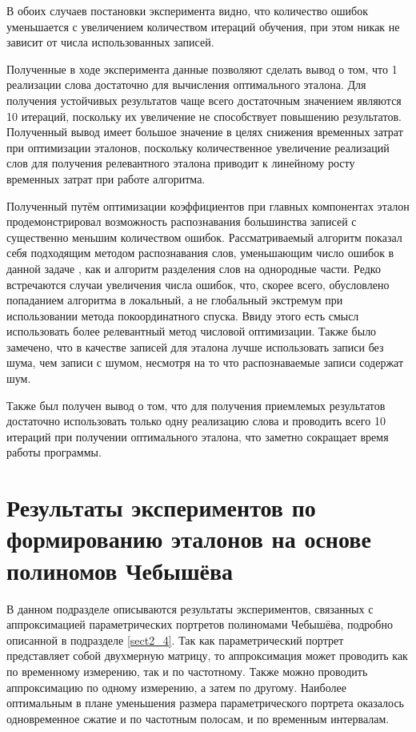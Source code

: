В обоих случаев постановки эксперимента видно, что количество ошибок уменьшается с увеличением количеством итераций обучения, при этом никак не зависит от числа использованных записей.

Полученные в ходе эксперимента данные позволяют сделать вывод о том, что 1 реализации слова достаточно для вычисления оптимального эталона.
Для получения устойчивых результатов чаще всего достаточным значением являются 10 итераций, поскольку их увеличение не способствует повышению результатов.
Полученный вывод имеет большое значение в целях снижения временных затрат при оптимизации эталонов, поскольку количественное увеличение реализаций слов для получения релевантного эталона приводит к линейному росту временных затрат при работе алгоритма.

Полученный путём оптимизации коэффициентов при главных компонентах эталон продемонстрировал возможность распознавания большинства записей с существенно меньшим количеством ошибок.
Рассматриваемый алгоритм показал себя подходящим методом распознавания слов, уменьшающим число ошибок в данной задаче \cite{kolokolov2015compare}, как и алгоритм разделения слов на однородные части.
Редко встречаются случаи увеличения числа ошибок, что, скорее всего, обусловлено попаданием алгоритма в локальный, а не глобальный экстремум при использовании метода покоординатного спуска.
Ввиду этого есть смысл использовать более релевантный метод числовой оптимизации.
Также было замечено, что в качестве записей для эталона лучше использовать записи без шума, чем записи с шумом, несмотря на то что распознаваемые записи содержат шум.

Также был получен вывод о том, что для получения приемлемых результатов достаточно использовать только одну реализацию слова и проводить всего 10 итераций при получении оптимального эталона, что заметно сокращает время работы программы.

\clearpage


\section{Результаты экспериментов по формированию эталонов на основе полиномов Чебышёва} \label{sect3_4}

В данном подразделе описываются результаты экспериментов, связанных с аппроксимацией параметрических портретов полиномами Чебышёва, подробно описанной в подразделе \ref{sect2_4}.
Так как параметрический портрет представляет собой двухмерную матрицу, то аппроксимация может проводить как по временному измерению, так и по частотному.
Также можно проводить аппроксимацию по одному измерению, а затем по другому.
Наиболее оптимальным в плане уменьшения размера параметрического портрета оказалось одновременное сжатие и по частотным полосам, и по временным интервалам.

